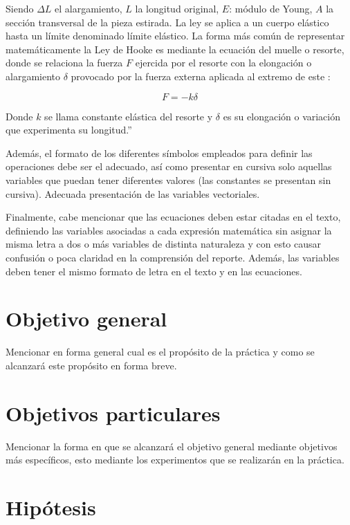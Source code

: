 \documentclass{replab}
\begin{document}
Siendo $\Delta L$ el alargamiento, $L$ la longitud original, $E$: módulo de Young, $A$ la sección transversal de la pieza estirada. La ley se aplica a un cuerpo elástico hasta un límite denominado límite elástico. La forma más común de representar matemáticamente la Ley de Hooke es mediante la ecuación del muelle o resorte, donde se relaciona la fuerza $F$ ejercida por el resorte con la elongación o alargamiento $\delta$ provocado por la fuerza externa aplicada al extremo de este \cite{feynman}:

\begin{equation}
    F = -k \delta
\end{equation}

Donde $k$ se llama constante elástica del resorte y $\delta$ es su elongación o variación que experimenta su longitud.”

Además, el formato de los diferentes símbolos empleados para definir las operaciones debe ser el adecuado, así como presentar en cursiva solo aquellas variables que puedan tener diferentes valores (las constantes se presentan sin cursiva). Adecuada presentación de las variables vectoriales.

Finalmente, cabe mencionar que las ecuaciones deben estar citadas en el texto, definiendo las variables asociadas a cada expresión matemática sin asignar la misma letra a dos o más variables de distinta naturaleza y con esto causar confusión o poca claridad en la comprensión del reporte. Además, las variables deben tener el mismo formato de letra en el texto y en las ecuaciones.

\section{Objetivo general}

Mencionar en forma general cual es el propósito de la práctica y como se alcanzará este propósito en forma breve.

\section{Objetivos particulares}

Mencionar la forma en que se alcanzará el objetivo general mediante objetivos más específicos, esto mediante los experimentos que se realizarán en la práctica.

\section{Hipótesis}
\end{document}
